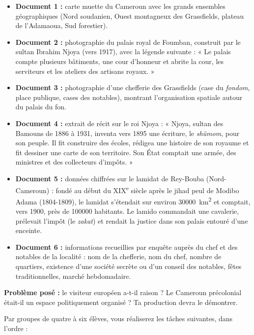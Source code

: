 \documentclass[11pt]{article}
\newcommand{\cle}[1]{{\popxbold\color{popdark}#1}}
\newcounter{popsec}
\newcounter{popsub}
\newcommand{\courssub}[1]{%
  \stepcounter{popsub}%
  \par\vspace{9pt}\noindent{\popxbold\fontsize{11.5}{13}\selectfont\color{popink}{\color{poporange}\thepopsec.\thepopsub}\hspace{6pt}#1}\par\nopagebreak\vspace{4pt}
}
\begin{document}
\begin{itemize}
\item \textbf{Document 1 :} carte muette du Cameroun avec les grands ensembles géographiques (Nord soudanien, Ouest montagneux des Grassfields, plateau de l'Adamaoua, Sud forestier).
\item \textbf{Document 2 :} photographie du palais royal de Foumban, construit par le sultan \cle{Ibrahim Njoya} (vers 1917), avec la légende suivante : « Le palais compte plusieurs bâtiments, une cour d'honneur et abrite la cour, les serviteurs et les ateliers des artisans royaux. »
\item \textbf{Document 3 :} photographie d'une chefferie des Grassfields (case du \emph{fondom}, place publique, cases des notables), montrant l'organisation spatiale autour du palais du \cle{fon}.
\item \textbf{Document 4 :} extrait de récit sur le roi Njoya : « Njoya, sultan des Bamouns de 1886 à 1931, inventa vers 1895 une écriture, le \emph{shümom}, pour son peuple. Il fit construire des écoles, rédigea une histoire de son royaume et fit dessiner une carte de son territoire. Son État comptait une armée, des ministres et des collecteurs d'impôts. »
\item \textbf{Document 5 :} données chiffrées sur le lamidat de \cle{Rey-Bouba} (Nord-Cameroun) : fondé au début du XIX\textsuperscript{e} siècle après le jihad peul de Modibo Adama (1804-1809), le lamidat s'étendait sur environ \SI{30000}{km^{2}} et comptait, vers 1900, près de \num{100000} habitants. Le \cle{lamido} commandait une cavalerie, prélevait l'impôt (le \emph{zakat}) et rendait la justice dans son palais entouré d'une enceinte.
\item \textbf{Document 6 :} informations recueillies par enquête auprès du chef et des notables de la localité : nom de la chefferie, nom du chef, nombre de quartiers, existence d'une société secrète ou d'un conseil des notables, fêtes traditionnelles, marché hebdomadaire.
\end{itemize}

\textbf{Problème posé :} le visiteur européen a-t-il raison ? Le Cameroun précolonial était-il un espace politiquement organisé ? Ta production devra le démontrer.

\courssub{Consignes}

Par groupes de quatre à six élèves, vous réaliserez les tâches suivantes, dans l'ordre :
\end{document}
